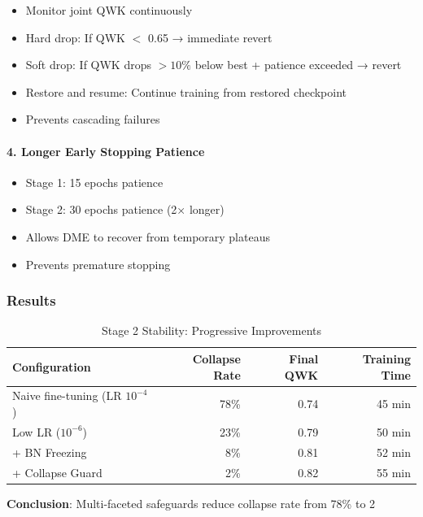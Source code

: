 \documentclass[12pt,a4paper]{article}
\begin{document}
\begin{itemize}
    \item Monitor joint QWK continuously
    \item Hard drop: If QWK $<$ 0.65 → immediate revert
    \item Soft drop: If QWK drops $> 10\%$ below best + patience exceeded → revert
    \item Restore and resume: Continue training from restored checkpoint
    \item Prevents cascading failures
\end{itemize}

\paragraph{4. Longer Early Stopping Patience}

\begin{itemize}
    \item Stage 1: 15 epochs patience
    \item Stage 2: 30 epochs patience (2× longer)
    \item Allows DME to recover from temporary plateaus
    \item Prevents premature stopping
\end{itemize}

\subsubsection{Results}

\begin{table}[H]
\centering
\small
\caption{Stage 2 Stability: Progressive Improvements}
\begin{tabular}{|l|r|r|r|}
\hline
\textbf{Configuration} & \textbf{Collapse Rate} & \textbf{Final QWK} & \textbf{Training Time} \\
\hline
Naive fine-tuning (LR $10^{-4}$) & 78\% & 0.74 & 45 min \\
Low LR ($10^{-6}$) & 23\% & 0.79 & 50 min \\
+ BN Freezing & 8\% & 0.81 & 52 min \\
+ Collapse Guard & 2\% & 0.82 & 55 min \\
\hline
\end{tabular}
\end{table}

\textbf{Conclusion}: Multi-faceted safeguards reduce collapse rate from 78\% to 2%
\end{document}
